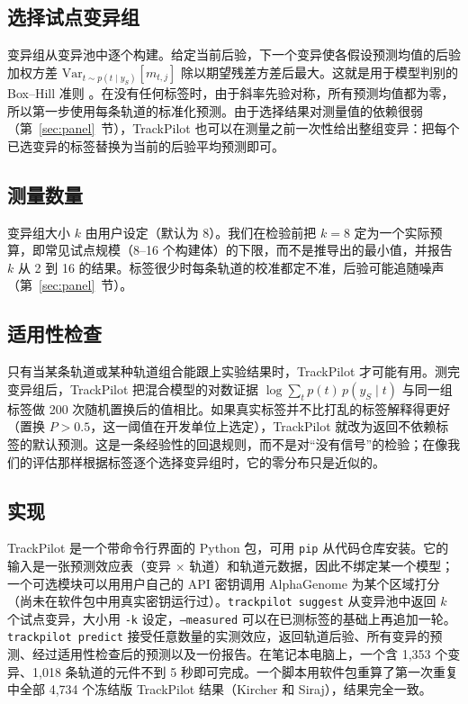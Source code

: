\documentclass[webpdf,contemporary,large]{oup-authoring-template}
\newcommand{\tp}{TrackPilot}
\begin{document}
\subsection{选择试点变异组}

变异组从变异池中逐个构建。给定当前后验，下一个变异使各假设预测均值的后验加权方差 $\mathrm{Var}_{t \sim p(t\mid y_S)}[m_{t,j}]$ 除以期望残差方差后最大。这就是用于模型判别的 Box--Hill 准则 \citep{box1967discrimination,rainforth2024modern}。在没有任何标签时，由于斜率先验对称，所有预测均值都为零，所以第一步使用每条轨道的标准化预测。由于选择结果对测量值的依赖很弱（第~\ref{sec:panel}~节），\tp{} 也可以在测量之前一次性给出整组变异：把每个已选变异的标签替换为当前的后验平均预测即可。

\subsection{测量数量}

变异组大小 $k$ 由用户设定（默认为 8）。我们在检验前把 $k=8$ 定为一个实际预算，即常见试点规模（8--16 个构建体）的下限，而不是推导出的最小值，并报告 $k$ 从 2 到 16 的结果。标签很少时每条轨道的校准都定不准，后验可能追随噪声（第~\ref{sec:panel}~节）。

\subsection{适用性检查}

只有当某条轨道或某种轨道组合能跟上实验结果时，\tp{} 才可能有用。测完变异组后，\tp{} 把混合模型的对数证据 $\log\sum_t p(t)\,p(y_S\mid t)$ 与同一组标签做 200 次随机置换后的值相比。如果真实标签并不比打乱的标签解释得更好（置换 $P > 0.5$，这一阈值在开发单位上选定），\tp{} 就改为返回不依赖标签的默认预测。这是一条经验性的回退规则，而不是对“没有信号”的检验；在像我们的评估那样根据标签逐个选择变异组时，它的零分布只是近似的。

\subsection{实现}

\tp{} 是一个带命令行界面的 Python 包，可用 \texttt{pip} 从代码仓库安装。它的输入是一张预测效应表（变异 $\times$ 轨道）和轨道元数据，因此不绑定某一个模型；一个可选模块可以用用户自己的 API 密钥调用 AlphaGenome 为某个区域打分（尚未在软件包中用真实密钥运行过）。\texttt{trackpilot suggest} 从变异池中返回 $k$ 个试点变异，大小用 \texttt{-k} 设定，\texttt{--measured} 可以在已测标签的基础上再追加一轮。\texttt{trackpilot predict} 接受任意数量的实测效应，返回轨道后验、所有变异的预测、经过适用性检查后的预测以及一份报告。在笔记本电脑上，一个含 1,353 个变异、1,018 条轨道的元件不到 5 秒即可完成。一个脚本用软件包重算了第一次重复中全部 4,734 个冻结版 \tp{} 结果（Kircher 和 Siraj），结果完全一致。
\end{document}
